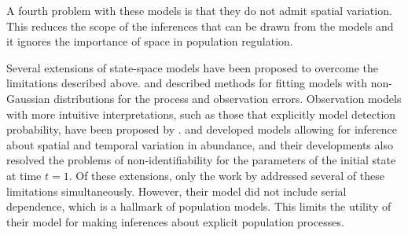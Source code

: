 \documentclass[12pt]{article}
\begin{document}
A fourth problem with these models is that they do not admit
spatial variation. This reduces the scope of the inferences that can
be drawn from the models and it ignores the importance of space in
population regulation.

Several extensions of state-space models have been proposed to
overcome the limitations described above. \citet{devalpine_hastings:2002} and
\citet{kery_etal:2009} described methods for fitting models with non-Gaussian
distributions for the process and observation errors. Observation models with
more intuitive interpretations, such as those that explicitly model
detection probability, have been proposed by \citet{kery_etal:2009}. \citet{lele_etal:1998} and
\citet{kery_etal:2009} developed models allowing for inference about
spatial and temporal variation in abundance, and their developments
also resolved the problems of non-identifiability for the parameters
of the initial state at time $t=1$. Of these extensions, only
the work by \citet{kery_etal:2009} addressed several of these limitations
simultaneously. However, their model did not include serial
dependence, which is a hallmark of population models. This
limits the utility of their model for making inferences about explicit
population processes.
\end{document}
